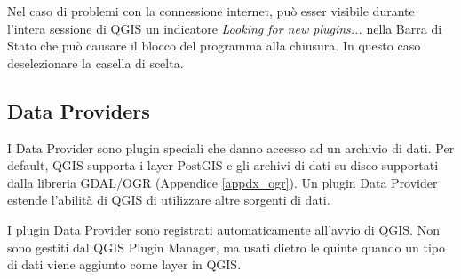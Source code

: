 Nel caso di problemi con la connessione internet, può esser visibile durante l'intera sessione di QGIS un indicatore  \textit{Looking for new plugins...} nella Barra di Stato che può causare il blocco del programma alla chiusura. In questo caso deselezionare la casella di scelta.

\subsection{Data Providers}

I Data Provider sono plugin speciali che danno accesso ad un archivio di dati. Per default, QGIS supporta i layer PostGIS e gli archivi di dati su disco supportati dalla libreria  GDAL/OGR (Appendice \ref{appdx_ogr}).
Un plugin Data Provider estende l'abilità di QGIS di utilizzare altre sorgenti di dati.

I plugin Data Provider sono registrati automaticamente all'avvio di QGIS. Non sono gestiti dal QGIS Plugin Manager, ma usati dietro le quinte quando un tipo di dati viene aggiunto come layer in QGIS.
